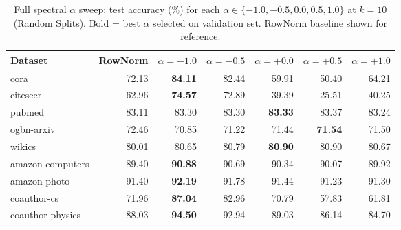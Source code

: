 \begin{table}[t]
\centering\small\setlength{\tabcolsep}{4pt}
\caption{Full spectral $\alpha$ sweep: test accuracy (\%) for each $\alpha \in \{-1.0, -0.5, 0.0, 0.5, 1.0\}$ at $k=10$ (Random Splits). Bold = best $\alpha$ selected on validation set. RowNorm baseline shown for reference.}
\label{tab:alpha_sweep_full_random}
\begin{tabular}{lrrrrrr}
\toprule
Dataset & RowNorm & $\alpha=-1.0$ & $\alpha=-0.5$ & $\alpha=+0.0$ & $\alpha=+0.5$ & $\alpha=+1.0$ \\
\midrule
cora & 72.13 & \textbf{84.11} & 82.44 & 59.91 & 50.40 & 64.21 \\
citeseer & 62.96 & \textbf{74.57} & 72.89 & 39.39 & 25.51 & 40.25 \\
pubmed & 83.11 & 83.30 & 83.30 & \textbf{83.33} & 83.37 & 83.24 \\
ogbn\mbox{-}arxiv & 72.46 & 70.85 & 71.22 & 71.44 & \textbf{71.54} & 71.50 \\
wikics & 80.01 & 80.65 & 80.79 & \textbf{80.90} & 80.90 & 80.67 \\
amazon\mbox{-}computers & 89.40 & \textbf{90.88} & 90.69 & 90.34 & 90.07 & 89.92 \\
amazon\mbox{-}photo & 91.40 & \textbf{92.19} & 91.78 & 91.44 & 91.23 & 91.30 \\
coauthor\mbox{-}cs & 71.96 & \textbf{87.04} & 82.96 & 70.79 & 57.83 & 61.81 \\
coauthor\mbox{-}physics & 88.03 & \textbf{94.50} & 92.94 & 89.03 & 86.14 & 84.70 \\
\bottomrule\end{tabular}\end{table}